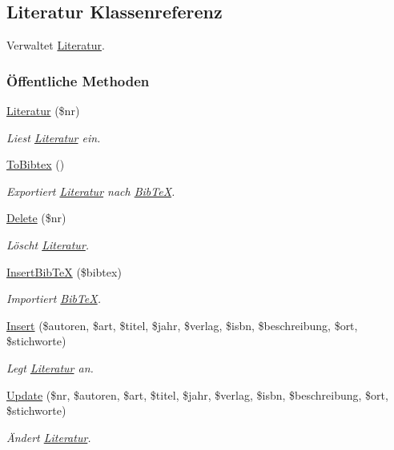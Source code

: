 \hypertarget{classLiteratur}{
\subsection{Literatur Klassenreferenz}
\label{classLiteratur}
}
Verwaltet \hyperlink{classLiteratur}{Literatur}.  


\subsubsection*{\"{O}ffentliche Methoden}
\begin{CompactItemize}
\item 
\hyperlink{classLiteratur_55626b912da4c041eaf981781ed6c640}{Literatur} (\$nr)
\begin{CompactList}\small\item\em Liest \hyperlink{classLiteratur}{Literatur} ein. \item\end{CompactList}\item 
\hyperlink{classLiteratur_11f6d1a4409c41638ff6693f65699ff3}{To\-Bibtex} ()
\begin{CompactList}\small\item\em Exportiert \hyperlink{classLiteratur}{Literatur} nach \hyperlink{classBibTeX}{Bib\-Te\-X}. \item\end{CompactList}\item 
\hyperlink{classLiteratur_f5b265d349df2a9d17079b81d808fa89}{Delete} (\$nr)
\begin{CompactList}\small\item\em Löscht \hyperlink{classLiteratur}{Literatur}. \item\end{CompactList}\item 
\hyperlink{classLiteratur_d466a307b1971ee736e1d4ba9342dc55}{Insert\-Bib\-Te\-X} (\$bibtex)
\begin{CompactList}\small\item\em Importiert \hyperlink{classBibTeX}{Bib\-Te\-X}. \item\end{CompactList}\item 
\hyperlink{classLiteratur_3347551316e8f73659fc6f32ac6095df}{Insert} (\$autoren, \$art, \$titel, \$jahr, \$verlag, \$isbn, \$beschreibung, \$ort, \$stichworte)
\begin{CompactList}\small\item\em Legt \hyperlink{classLiteratur}{Literatur} an. \item\end{CompactList}\item 
\hyperlink{classLiteratur_b613c28476ea28058f8fc2bccb57c923}{Update} (\$nr, \$autoren, \$art, \$titel, \$jahr, \$verlag, \$isbn, \$beschreibung, \$ort, \$stichworte)
\begin{CompactList}\small\item\em Ändert \hyperlink{classLiteratur}{Literatur}. \item\end{CompactList}\end{CompactItemize}
